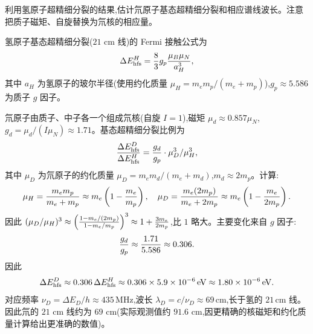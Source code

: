 \begin{question}
利用氢原子超精细分裂的结果,估计氘原子基态超精细分裂和相应谱线波长。注意把质子磁矩、自旋替换为氘核的相应量。
\end{question}
\begin{solution}
氢原子基态超精细分裂($21$ cm 线)的 Fermi 接触公式为
\[
\Delta E_{\rm hfs}^H = {8\over3}g_p{\mu_B\mu_N\over a_H^3},
\]
其中 $a_H$ 为氢原子的玻尔半径(使用约化质量 $\mu_H=m_e m_p/(m_e+m_p)$),$g_p\approx5.586$ 为质子 $g$ 因子。

氘原子由质子、中子各一个组成氘核(自旋 $I=1$),磁矩 $\mu_d\approx0.857\mu_N$,$g_d=\mu_d/(I\mu_N)\approx1.71$。基态超精细分裂比例为
\[
{\Delta E_{\rm hfs}^D\over\Delta E_{\rm hfs}^H}
= {g_d\over g_p}\cdot{\mu_D^3/\mu_H^3},
\]
其中 $\mu_D$ 为氘原子的约化质量 $\mu_D=m_e m_d/(m_e+m_d)$,$m_d\approx2m_p$。计算:
\[
\mu_H = {m_e m_p\over m_e+m_p}\approx m_e\left(1-{m_e\over m_p}\right),\quad
\mu_D = {m_e(2m_p)\over m_e+2m_p}\approx m_e\left(1-{m_e\over2m_p}\right).
\]
因此 $(\mu_D/\mu_H)^3 \approx \left({1-m_e/(2m_p)\over1-m_e/m_p}\right)^3 \approx 1 + {3m_e\over2m_p}$,比 $1$ 略大。主要变化来自 $g$ 因子:
\[
{g_d\over g_p} \approx {1.71\over5.586}\approx0.306.
\]
因此
\[
\Delta E_{\rm hfs}^D \approx 0.306\,\Delta E_{\rm hfs}^H \approx 0.306\times5.9\times10^{-6}\,\mathrm{eV} \approx 1.80\times10^{-6}\,\mathrm{eV}.
\]
对应频率 $\nu_D=\Delta E_D/h \approx 435\,\mathrm{MHz}$,波长 $\lambda_D=c/\nu_D \approx 69\,\mathrm{cm}$,长于氢的 $21\,\mathrm{cm}$ 线。因此氘的 $21$ cm 线约为 $69$ cm(实际观测值约 $91.6$ cm,因更精确的核磁矩和约化质量计算给出更准确的数值)。
\end{solution}

